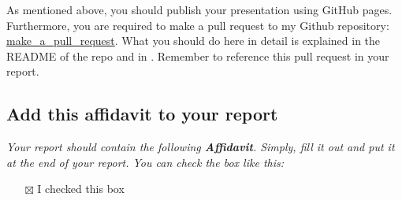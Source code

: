 \documentclass[
  a4paper,
  onecolumn,
  oneside]{scrartcl}
\providecommand{\tightlist}{%
  \setlength{\itemsep}{0pt}\setlength{\parskip}{0pt}}\usepackage{longtable,booktabs,array}
\begin{document}
As mentioned above, you should publish your presentation using GitHub
pages. Furthermore, you are required to make a pull request to my Github
repository:
\href{https://github.com/hubchev/make_a_pull_request}{make\_a\_pull\_request}.
What you should do here in detail is explained in the README of the repo
and in \citet{Huber2024Data}. Remember to reference this pull request in
your report.

\subsection{Add this affidavit to your report}\label{sec-affidavit}

\emph{Your report should contain the following \textbf{Affidavit}.
Simply, fill it out and put it at the end of your report. You can check
the box like this:}

\begin{itemize}
\tightlist
\item[$\boxtimes$]
  I checked this box
\end{itemize}
\end{document}
